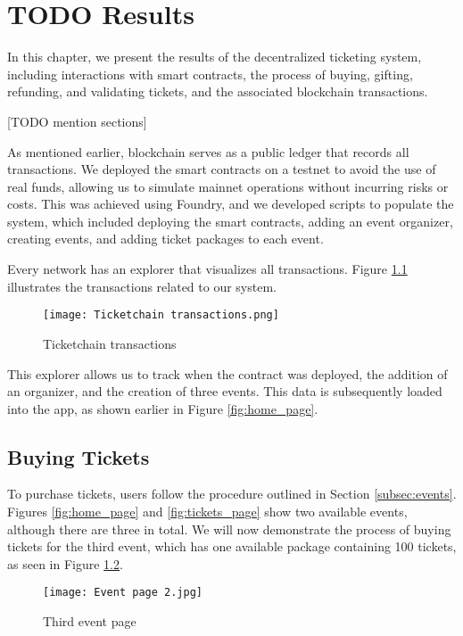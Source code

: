 \chapter{TODO Results}
\label{ch:results}

In this chapter, we present the results of the decentralized ticketing system,
including interactions with smart contracts, the process of buying, gifting,
refunding, and validating tickets, and the associated blockchain transactions.

    [TODO mention sections]

As mentioned earlier, blockchain serves as a public ledger that records all
transactions. We deployed the smart contracts on a testnet to avoid the use of
real funds, allowing us to simulate mainnet operations without incurring risks
or costs. This was achieved using Foundry, and we developed scripts to populate
the system, which included deploying the smart contracts, adding an event
organizer, creating events, and adding ticket packages to each event.

Every network has an explorer that visualizes all transactions. Figure
\ref{fig:ticketchain_transactions} illustrates the transactions related to our
system.
\begin{figure}[H]
    \texttt{[image: Ticketchain transactions.png]}
    \centering
    \caption{Ticketchain transactions}
    \label{fig:ticketchain_transactions}
\end{figure}

This explorer allows us to track when the contract was deployed, the addition
of an organizer, and the creation of three events. This data is subsequently
loaded into the app, as shown earlier in Figure \ref{fig:home_page}.

\section{Buying Tickets}
\label{sec:buy_tickets}

To purchase tickets, users follow the procedure outlined in Section
\ref{subsec:events}. Figures \ref{fig:home_page} and \ref{fig:tickets_page}
show two available events, although there are three in total. We will now
demonstrate the process of buying tickets for the third event, which has one
available package containing 100 tickets, as seen in Figure
\ref{fig:buy_tickets_event}.

\begin{figure}[H]
    \texttt{[image: Event page 2.jpg]}
    \centering
    \caption{Third event page}
    \label{fig:buy_tickets_event}
\end{figure}

